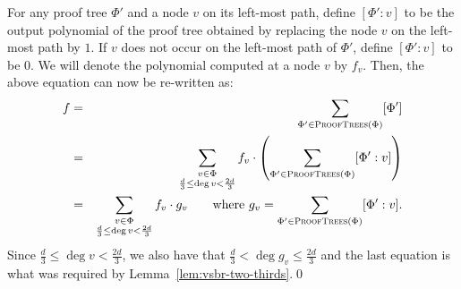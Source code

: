 For any proof tree $\Phi'$ and a node $v$ on its left-most path,
define $[\Phi':v]$ to be the output polynomial of the proof tree 
obtained by replacing the node $v$ on the left-most path by $1$. 
If $v$ does not occur on the
left-most path of $\Phi'$, define $[\Phi':v]$ to be $0$. We will 
denote the polynomial computed at a node $v$ by $f_{v}$. Then, the
above equation can now be re-written as:
\begin{eqnarray*}
f & = & \sum_{\Phi' \in \textsc{ProofTrees}(\Phi)} [\Phi']\\
  & = & \sum_{\substack{v\in \Phi\\ \frac{d}{3}\leq \deg{v} < \frac{2d}{3}}} f_{v} \cdot \left( \sum_{\Phi'\in \textsc{ProofTrees}(\Phi)} [\Phi':v]\right)\\
  & = & \sum_{\substack{v\in \Phi\\ \frac{d}{3}\leq \deg{v} < \frac{2d}{3}}} f_{v} \cdot g_v\quad\quad\text{where $g_v = \sum_{\Phi'\in \textsc{ProofTrees}(\Phi)} [\Phi':v]$} .\\
\end{eqnarray*}
Since $\frac{d}{3} \leq \deg{v} < \frac{2d}{3}$, we also have that
$\frac{d}{3} < \deg{g_v} \leq \frac{2d}{3}$ and the last equation is
what was required by Lemma~\ref{lem:vsbr-two-thirds}.\qed



